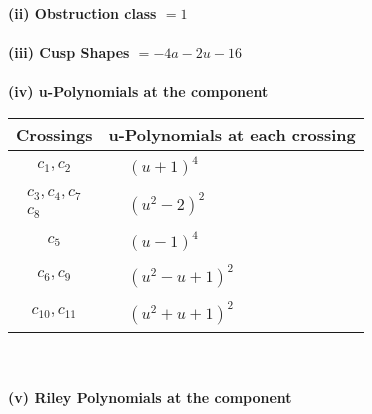 \documentclass[1p]{elsarticle_modified}
\theoremstyle{definition}
\begin{document}
\flushleft \textbf{(ii) Obstruction class $= 1$}\\~\\
\flushleft \textbf{(iii) Cusp Shapes $= -4 a-2 u-16$}\\~\\
\newpage\renewcommand{\arraystretch}{1}
\flushleft \textbf{(iv) u-Polynomials at the component}\newline \\
\begin{tabular}{m{50pt}|m{274pt}}
Crossings & \hspace{64pt}u-Polynomials at each crossing \\
\hline $$\begin{aligned}c_{1},c_{2}\end{aligned}$$&$\begin{aligned}
&(u+1)^4
\end{aligned}$\\
\hline $$\begin{aligned}c_{3},c_{4},c_{7}\\c_{8}\end{aligned}$$&$\begin{aligned}
&(u^2-2)^2
\end{aligned}$\\
\hline $$\begin{aligned}c_{5}\end{aligned}$$&$\begin{aligned}
&(u-1)^4
\end{aligned}$\\
\hline $$\begin{aligned}c_{6},c_{9}\end{aligned}$$&$\begin{aligned}
&(u^2- u+1)^2
\end{aligned}$\\
\hline $$\begin{aligned}c_{10},c_{11}\end{aligned}$$&$\begin{aligned}
&(u^2+u+1)^2
\end{aligned}$\\
\hline
\end{tabular}\\~\\
\newpage\renewcommand{\arraystretch}{1}
\flushleft \textbf{(v) Riley Polynomials at the component}\newline \\
\end{document}
